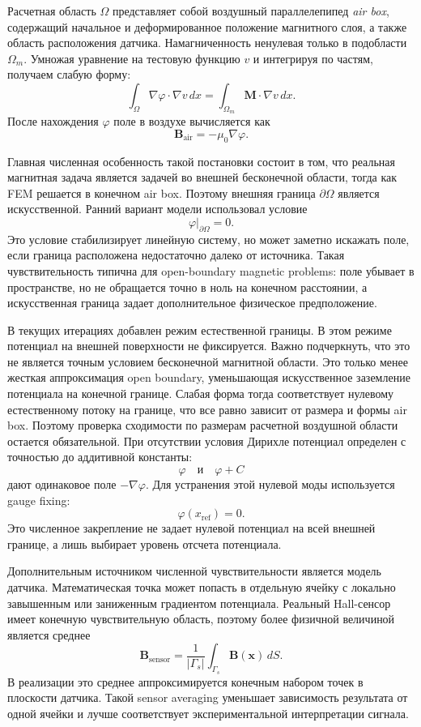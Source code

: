 \documentclass[12pt,a4paper]{article}
\begin{document}
Расчетная область \(\Omega\) представляет собой воздушный параллелепипед
\emph{air box}, содержащий начальное и деформированное положение магнитного
слоя, а также область расположения датчика. Намагниченность ненулевая только в
подобласти \(\Omega_m\). Умножая уравнение на тестовую функцию \(v\) и интегрируя
по частям, получаем слабую форму:
\[
    \int_\Omega
    \nabla\varphi\cdot\nabla v\,dx
    =
    \int_{\Omega_m}
    \mathbf M\cdot\nabla v\,dx.
\]
После нахождения \(\varphi\) поле в воздухе вычисляется как
\[
    \mathbf B_{\mathrm{air}} = -\mu_0\nabla\varphi.
\]

Главная численная особенность такой постановки состоит в том, что реальная
магнитная задача является задачей во внешней бесконечной области, тогда как FEM
решается в конечном air box. Поэтому внешняя граница \(\partial\Omega\) является
искусственной. Ранний вариант модели использовал условие
\[
    \varphi|_{\partial\Omega}=0.
\]
Это условие стабилизирует линейную систему, но может заметно искажать поле,
если граница расположена недостаточно далеко от источника. Такая чувствительность
типична для open-boundary magnetic problems: поле убывает в пространстве, но
не обращается точно в ноль на конечном расстоянии, а искусственная граница
задает дополнительное физическое предположение.

В текущих итерациях добавлен режим естественной границы. В этом режиме
потенциал на внешней поверхности не фиксируется. Важно подчеркнуть, что это не
является точным условием бесконечной магнитной области. Это только менее
жесткая аппроксимация open boundary, уменьшающая искусственное заземление
потенциала на конечной границе. Слабая форма тогда соответствует нулевому
естественному потоку на границе, что все равно зависит от размера и формы air
box. Поэтому проверка сходимости по размерам расчетной воздушной области
остается обязательной. При отсутствии условия Дирихле потенциал определен с
точностью до аддитивной константы:
\[
    \varphi \quad\text{и}\quad \varphi + C
\]
дают одинаковое поле \(-\nabla\varphi\). Для устранения этой нулевой моды
используется gauge fixing:
\[
    \varphi(x_{\mathrm{ref}})=0.
\]
Это численное закрепление не задает нулевой потенциал на всей внешней границе,
а лишь выбирает уровень отсчета потенциала.

Дополнительным источником численной чувствительности является модель датчика.
Математическая точка может попасть в отдельную ячейку с локально завышенным или
заниженным градиентом потенциала. Реальный Hall-сенсор имеет конечную
чувствительную область, поэтому более физичной величиной является среднее
\[
    \mathbf B_{\mathrm{sensor}}
    =
    \frac{1}{|\Gamma_s|}
    \int_{\Gamma_s}\mathbf B(\mathbf x)\,dS.
\]
В реализации это среднее аппроксимируется конечным набором точек в плоскости
датчика. Такой sensor averaging уменьшает зависимость результата от одной
ячейки и лучше соответствует экспериментальной интерпретации сигнала.
\end{document}
